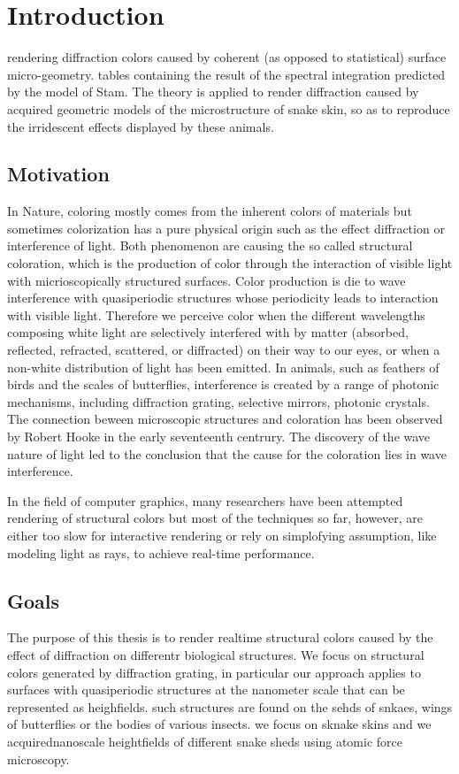 \section{Introduction}


rendering diffraction colors caused by coherent (as opposed to statistical) surface micro-geometry.
tables containing the result of the spectral integration predicted by the model of Stam. 
The theory is applied to render diffraction caused by acquired geometric models of the microstructure of snake skin, so as to reproduce the irridescent effects displayed by these animals.


\subsection{Motivation}
In Nature, coloring mostly comes from the inherent colors of materials but sometimes colorization has a pure physical origin such as the effect diffraction or interference of light. Both phenomenon are causing the so called structural coloration, which is the production of color through the interaction of visible light with micrioscopically structured surfaces. 
Color production is die to wave interference with quasiperiodic structures whose periodicity leads to interaction with visible light. Therefore we perceive color when the different wavelengths composing white light are selectively interfered with by matter (absorbed, reflected, refracted, scattered, or diffracted) on their way to our eyes, or when a non-white distribution of light has been emitted.
In animals, such as feathers of birds and the scales of butterflies, interference is created by a range of photonic mechanisms, including diffraction grating, selective mirrors, photonic crystals.
The connection beween microscopic structures and coloration has been observed by Robert Hooke in the early seventeenth centrury. The discovery of the wave nature of light led to the conclusion that the cause for the coloration lies in wave interference.

In the field of computer graphics, many researchers have been attempted rendering of structural colors but most of the techniques so far, however, are either too slow for interactive rendering or rely on simplofying assumption, like modeling light as rays, to achieve real-time performance. 

\subsection{Goals}
The purpose of this thesis is to render realtime structural colors caused by the effect of diffraction on differentr biological structures. We focus on structural colors generated by diffraction grating, in particular our approach applies to surfaces with quasiperiodic structures at the nanometer scale that can be represented as heighfields. such structures are found on the sehds of snkaes, wings of butterflies or the bodies of various insects. we focus on sknake skins and we acquirednanoscale heightfields of different snake sheds using atomic force microscopy. 

